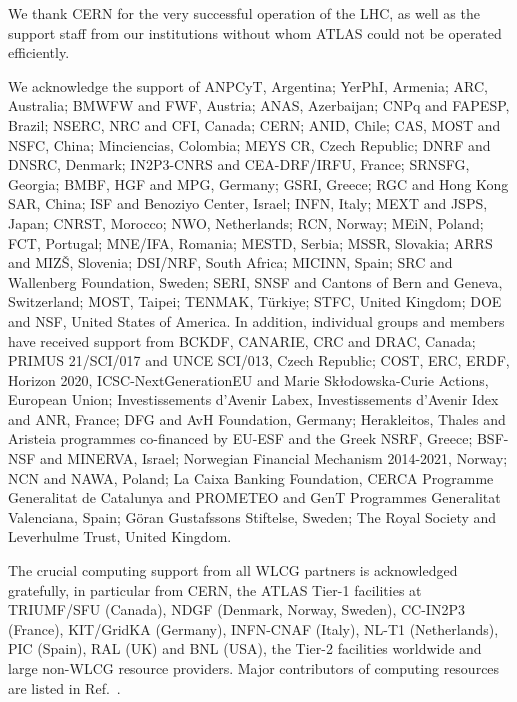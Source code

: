 

We thank CERN for the very successful operation of the LHC, as well as the
support staff from our institutions without whom ATLAS could not be
operated efficiently.

We acknowledge the support of 
ANPCyT, Argentina; 
YerPhI, Armenia; 
ARC, Australia; 
BMWFW and FWF, Austria; 
ANAS, Azerbaijan; 
CNPq and FAPESP, Brazil; 
NSERC, NRC and CFI, Canada; 
CERN; 
ANID, Chile; 
CAS, MOST and NSFC, China; 
Minciencias, Colombia; 
MEYS CR, Czech Republic; 
DNRF and DNSRC, Denmark; 
IN2P3-CNRS and CEA-DRF/IRFU, France; 
SRNSFG, Georgia; 
BMBF, HGF and MPG, Germany; 
GSRI, Greece; 
RGC and Hong Kong SAR, China; 
ISF and Benoziyo Center, Israel; 
INFN, Italy; 
MEXT and JSPS, Japan; 
CNRST, Morocco; 
NWO, Netherlands; 
RCN, Norway; 
MEiN, Poland; 
FCT, Portugal; 
MNE/IFA, Romania; 
MESTD, Serbia; 
MSSR, Slovakia; 
ARRS and MIZ\v{S}, Slovenia; 
DSI/NRF, South Africa; 
MICINN, Spain; 
SRC and Wallenberg Foundation, Sweden; 
SERI, SNSF and Cantons of Bern and Geneva, Switzerland; 
MOST, Taipei; 
TENMAK, T\"urkiye; 
STFC, United Kingdom; 
DOE and NSF, United States of America. 
In addition, individual groups and members have received support from 
BCKDF, CANARIE, CRC and DRAC, Canada; 
PRIMUS 21/SCI/017 and UNCE SCI/013, Czech Republic; 
COST, ERC, ERDF, Horizon 2020, ICSC-NextGenerationEU and Marie Sk{\l}odowska-Curie Actions, European Union; 
Investissements d'Avenir Labex, Investissements d'Avenir Idex and ANR, France; 
DFG and AvH Foundation, Germany; 
Herakleitos, Thales and Aristeia programmes co-financed by EU-ESF and the Greek NSRF, Greece; 
BSF-NSF and MINERVA, Israel; 
Norwegian Financial Mechanism 2014-2021, Norway; 
NCN and NAWA, Poland; 
La Caixa Banking Foundation, CERCA Programme Generalitat de Catalunya and PROMETEO and GenT Programmes Generalitat Valenciana, Spain; 
G\"{o}ran Gustafssons Stiftelse, Sweden; 
The Royal Society and Leverhulme Trust, United Kingdom.

The crucial computing support from all WLCG partners is acknowledged gratefully, in particular from CERN, the ATLAS Tier-1 facilities at TRIUMF/SFU (Canada), NDGF (Denmark, Norway, Sweden), CC-IN2P3 (France), KIT/GridKA (Germany), INFN-CNAF (Italy), NL-T1 (Netherlands), PIC (Spain), RAL (UK) and BNL (USA), the Tier-2 facilities worldwide and large non-WLCG resource providers. Major contributors of computing resources are listed in Ref.~\cite{ATL-SOFT-PUB-2023-001}.

